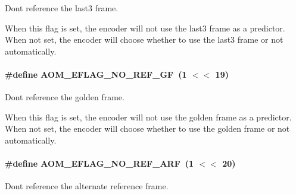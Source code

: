Don\textquotesingle{}t reference the last3 frame. 

When this flag is set, the encoder will not use the last3 frame as a predictor. When not set, the encoder will choose whether to use the last3 frame or not automatically. 
\paragraph[{\texorpdfstring{A\+O\+M\+\_\+\+E\+F\+L\+A\+G\+\_\+\+N\+O\+\_\+\+R\+E\+F\+\_\+\+GF}{AOM_EFLAG_NO_REF_GF}}]{\setlength{\rightskip}{0pt plus 5cm}\#define A\+O\+M\+\_\+\+E\+F\+L\+A\+G\+\_\+\+N\+O\+\_\+\+R\+E\+F\+\_\+\+GF~(1 $<$$<$ 19)}\hypertarget{group__aom__encoder_gaaef6fe76991abf87edd2f296eee999f8}{}\label{group__aom__encoder_gaaef6fe76991abf87edd2f296eee999f8}


Don\textquotesingle{}t reference the golden frame. 

When this flag is set, the encoder will not use the golden frame as a predictor. When not set, the encoder will choose whether to use the golden frame or not automatically. 
\paragraph[{\texorpdfstring{A\+O\+M\+\_\+\+E\+F\+L\+A\+G\+\_\+\+N\+O\+\_\+\+R\+E\+F\+\_\+\+A\+RF}{AOM_EFLAG_NO_REF_ARF}}]{\setlength{\rightskip}{0pt plus 5cm}\#define A\+O\+M\+\_\+\+E\+F\+L\+A\+G\+\_\+\+N\+O\+\_\+\+R\+E\+F\+\_\+\+A\+RF~(1 $<$$<$ 20)}\hypertarget{group__aom__encoder_ga9e2f989737d63ddf4e987a525d186a46}{}\label{group__aom__encoder_ga9e2f989737d63ddf4e987a525d186a46}


Don\textquotesingle{}t reference the alternate reference frame. 

